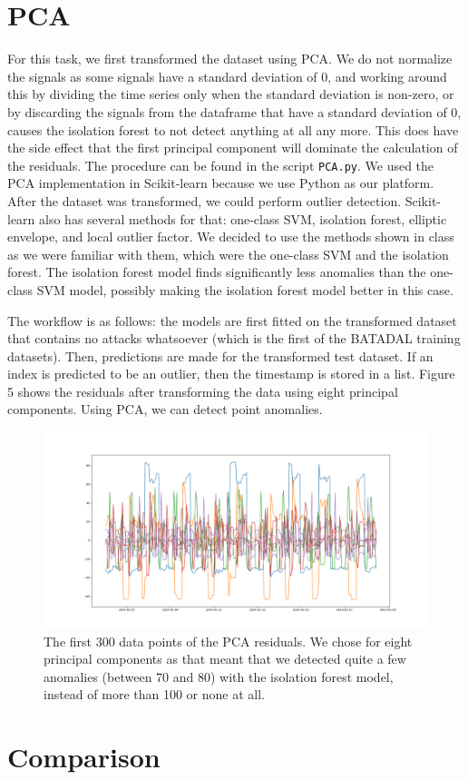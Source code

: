\documentclass[]{article}
\begin{document}
\clearpage
\section{PCA}
For this task, we first transformed the dataset using PCA. We do not normalize the signals as some signals have a standard deviation of 0, and working around this by dividing the time series only when the standard deviation is non-zero, or by discarding the signals from the dataframe that have a standard deviation of 0, causes the isolation forest to not detect anything at all any more. This does have the side effect that the first principal component will dominate the calculation of the residuals. The procedure can be found in the script \texttt{PCA.py}. We used the PCA implementation in Scikit-learn because we use Python as our platform. After the dataset was transformed, we could perform outlier detection. Scikit-learn also has several methods for that: one-class SVM, isolation forest, elliptic envelope, and local outlier factor. We decided to use the methods shown in class as we were familiar with them, which were the one-class SVM and the isolation forest. The isolation forest model finds significantly less anomalies than the one-class SVM model, possibly making the isolation forest model better in this case.

The workflow is as follows: the models are first fitted on the transformed dataset that contains no attacks whatsoever (which is the first of the BATADAL training datasets). Then, predictions are made for the transformed test dataset. If an index is predicted to be an outlier, then the timestamp is stored in a list. Figure 5 shows the residuals after transforming the data using eight principal components. Using PCA, we can detect point anomalies.
\begin{center}
	\begin{figure}[H]
		\includegraphics[width=18cm, keepaspectratio]{./visuallizations/PCA_residuals.png}
		\caption{The first 300 data points of the PCA residuals. We chose for eight principal components as that meant that we detected quite a few anomalies (between 70 and 80) with the isolation forest model, instead of more than 100 or none at all.}
		\label{signals}
	\end{figure}
\end{center}
\clearpage
\section{Comparison} 
\end{document}
